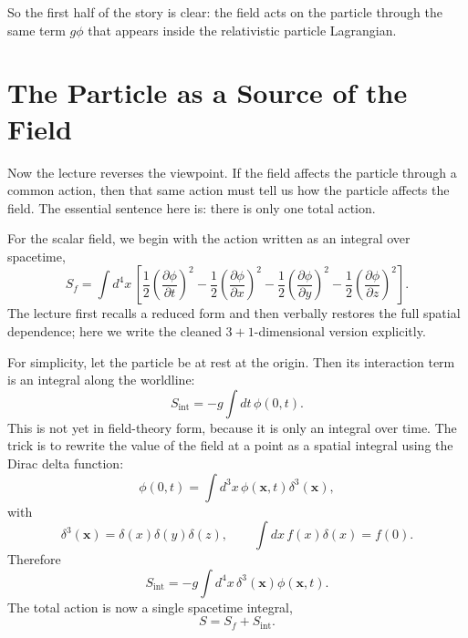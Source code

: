 So the first half of the story is clear: the field acts on the particle through the same term \(g\phi\) that appears inside the relativistic particle Lagrangian.

\section{The Particle as a Source of the Field}

Now the lecture reverses the viewpoint. If the field affects the particle through a common action, then that same action must tell us how the particle affects the field. The essential sentence here is: there is only one total action.

For the scalar field, we begin with the action written as an integral over spacetime,
\begin{equation}
S_f
=
\int d^4x\,
\left[
\frac12\left(\frac{\partial\phi}{\partial t}\right)^2
-\frac12\left(\frac{\partial\phi}{\partial x}\right)^2
-\frac12\left(\frac{\partial\phi}{\partial y}\right)^2
-\frac12\left(\frac{\partial\phi}{\partial z}\right)^2
\right].
\end{equation}
The lecture first recalls a reduced form and then verbally restores the full spatial dependence; here we write the cleaned \(3+1\)-dimensional version explicitly.

For simplicity, let the particle be at rest at the origin. Then its interaction term is an integral along the worldline:
\begin{equation}
S_{\mathrm{int}}=-g\int dt\,\phi(0,t).
\end{equation}
This is not yet in field-theory form, because it is only an integral over time. The trick is to rewrite the value of the field at a point as a spatial integral using the Dirac delta function:
\begin{equation}
\phi(0,t)=\int d^3x\,\phi(\mathbf x,t)\delta^3(\mathbf x),
\end{equation}
with
\begin{equation}
\delta^3(\mathbf x)=\delta(x)\delta(y)\delta(z),
\qquad
\int dx\,f(x)\delta(x)=f(0).
\end{equation}
Therefore
\begin{equation}
S_{\mathrm{int}}
=
-g\int d^4x\,\delta^3(\mathbf x)\phi(\mathbf x,t).
\end{equation}
The total action is now a single spacetime integral,
\begin{equation}
S=S_f+S_{\mathrm{int}}.
\end{equation}

